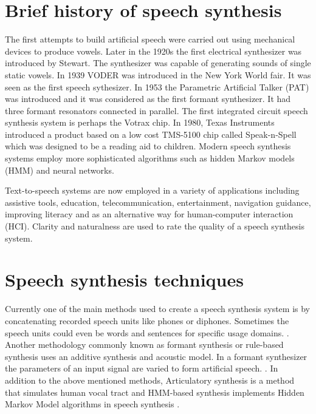 \documentclass[11pt,a4paper,oneside,article]{memoir}
\begin{document}
\section{Brief history of speech synthesis}
The first attempts to build artificial speech were carried out using mechanical devices to produce vowels. Later in the 1920s the first electrical synthesizer was introduced by Stewart. The synthesizer was capable of generating sounds of single static vowels. In 1939 VODER was introduced in the New York World fair. It was seen as the first speech sythesizer.  In 1953 the Parametric Artificial Talker (PAT) was introduced and it was considered as the first formant synthesizer. It had three formant resonators connected in parallel. The first integrated circuit speech synthesis system is perhaps the Votrax chip. In 1980, Texas Instruments introduced a product based on a low cost TMS-5100 chip called Speak-n-Spell which was designed to be a reading aid to children. Modern speech synthesis systems employ more sophisticated algorithms such as hidden Markov models (HMM) and neural networks. \cite[4-10.]{hut}

Text-to-speech systems are now employed in a variety of applications including assistive tools, education, telecommunication, entertainment, navigation guidance, improving literacy \cite{rose2007plato} and as an alternative way for human-computer interaction (HCI). Clarity and naturalness are used to rate the quality of a speech synthesis system. \cite[79.]{hut}

\section{Speech synthesis techniques}
Currently one of the main methods used to create a speech synthesis system is by concatenating recorded speech units like phones or diphones.  Sometimes the speech units could even be words and sentences for specific usage domains. \cite{allen}. Another methodology commonly known as formant synthesis or rule-based synthesis uses an  additive synthesis and acoustic model. In a formant synthesizer the parameters of an input signal are varied to form  artificial speech. \cite{burk}. In addition to the above mentioned methods, Articulatory synthesis is a method that simulates human vocal tract and HMM-based synthesis implements Hidden Markov Model algorithms in speech synthesis \cite{hut}.

\end{document}

